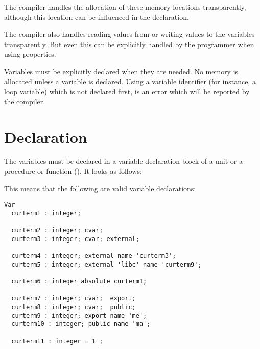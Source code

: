 The \fpc compiler handles the allocation of these memory locations
transparently, although this location can be influenced in the declaration.

The \fpc compiler also handles reading values from or writing values to
the variables transparently. But even this can be explicitly handled by the
programmer when using properties.

Variables must be explicitly declared when they are needed. No memory is
allocated unless a variable is declared. Using a variable identifier (for
instance, a loop variable) which is not declared first, is an error which
will be reported by the compiler. 

\section{Declaration}
The variables must be declared in a variable declaration block of a unit
or a procedure or function (). It looks as follows:


 
This means that the following are valid variable declarations:
 
\begin{verbatim}
Var
  curterm1 : integer;

  curterm2 : integer; cvar;
  curterm3 : integer; cvar; external;

  curterm4 : integer; external name 'curterm3';
  curterm5 : integer; external 'libc' name 'curterm9';

  curterm6 : integer absolute curterm1;

  curterm7 : integer; cvar;  export;
  curterm8 : integer; cvar;  public;
  curterm9 : integer; export name 'me';
  curterm10 : integer; public name 'ma';

  curterm11 : integer = 1 ;
\end{verbatim}

